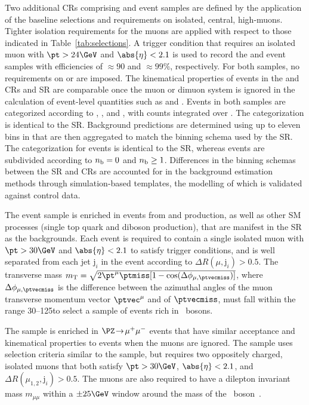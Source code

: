 Two additional CRs comprising \mj and \mmj event samples are defined
by the application of the baseline selections and requirements on
isolated, central, high-\pt muons. Tighter isolation requirements for
the muons are applied with respect to those indicated in
Table~\ref{tab:selections}.  A trigger condition that requires an
isolated muon with $\pt > 24\GeV$ and $\abs{\eta} < 2.1$ is used to
record the \mj and \mmj event samples with efficiencies of
${\approx}90$ and ${\approx}99\%$, respectively. For both samples, no
requirements on \alphat or \bdphi are imposed. The kinematical
properties of events in the \mj and \mmj CRs and SR are comparable
once the muon or dimuon system is ignored in the calculation of
event-level quantities such as \scalht and \mht.  Events in both
samples are categorized according to \njet, \scalht, and \nb, with
counts integrated over \mht. The \njet categorization is identical to
the SR. Background predictions are determined using up to eleven bins
in \scalht that are then aggregated to match the \scalht binning
schema used by the SR. The \nb categorization for \mj events is
identical to the SR, whereas \mmj events are subdivided according to
$n_{\mathrm{b}} = 0$ and $n_{\mathrm{b}} \geq 1$. Differences in the binning schemas between
the SR and CRs are accounted for in the background estimation methods
through simulation-based templates, the modelling of which is
validated against control data.

The \mj event sample is enriched in events from \wmj and \ttbar
production, as well as other SM processes (\eg single top quark and
diboson production), that are manifest in the SR as the \lost
backgrounds. Each event is required to contain a single isolated muon
with $\pt > 30\GeV$ and $\abs{\eta} < 2.1$ to satisfy trigger
conditions, and is well separated from each jet $\mathrm{j}_i$ in the
event according to ${\Delta}R(\mu,\mathrm{j}_i) > 0.5$. The transverse
mass $m_\mathrm{T} = \sqrt{2\pt^\mu\ptmiss[1-
  \cos(\Delta\phi_{\mu,\ptvecmiss})]}$, where
$\Delta\phi_{\mu,\ptvecmiss}$ is the difference between the azimuthal
angles of the muon transverse momentum vector $\ptvec^\mu$ and of
$\ptvecmiss$, must fall within the range 30--125\GeV to select a
sample of events rich in \PW\ bosons.

The \mmj sample is enriched in $\PZ\! \to\!  \mu^+\mu^-$ events that
have similar acceptance and kinematical properties to \znunuj events
when the muons are ignored. The sample uses selection criteria similar
to the \mj sample, but requires two oppositely charged, isolated muons
that both satisfy $\pt > 30\GeV$, $\abs{\eta} < 2.1$, and
${\Delta}R(\mu_{1,2},\mathrm{j}_i) > 0.5$. The muons are also required
to have a dilepton invariant mass $m_{\mu\mu}$ within a ${\pm}25\GeV$
window around the mass of the \cPZ\ boson~\cite{Patrignani:2016xqp}.

